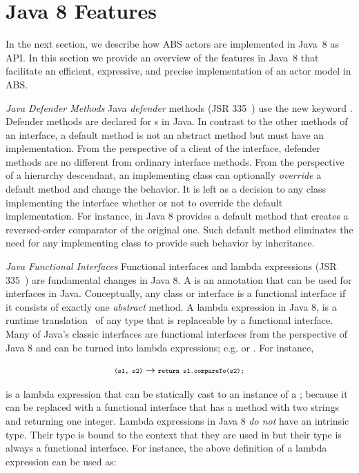 \section{Java 8 Features}
\label{sec:j8:features}

In the next section, we describe how ABS actors are implemented in Java~8 as API.
In this section we provide an overview of the features in Java~8 that facilitate an efficient, expressive, and precise implementation of an actor model
in ABS.

\textsl{Java Defender Methods}
Java \emph{defender} methods (JSR 335~\cite{jsr335}) use the new keyword . 
Defender methods are declared for s in Java. 
In contrast to the other methods of an interface, a default method is not an abstract method but  must have an implementation.
From the perspective of a client of the interface, defender methods are no different from ordinary interface methods.
From the perspective of a hierarchy descendant, an implementing class can optionally \textit{override} a default method and change the behavior.
It is left as a decision to any class implementing the interface whether or not to override the default implementation.
For instance, in Java 8  provides a default method  that creates a reversed-order comparator of the original one.
Such default method eliminates the need for any implementing class to provide such behavior by inheritance.

\textsl{Java Functional Interfaces}
Functional interfaces and lambda expressions (JSR 335~\cite{jsr335}) are fundamental changes in Java 8. 
A  is an annotation that can be used for interfaces in Java.
Conceptually, any class or interface is a functional interface if it consists of exactly one \emph{abstract} method.
A lambda expression in Java 8, is a runtime translation~\cite{jsr335:lambda:translation} of any type that is replaceable by a functional interface.
Many of Java's classic interfaces are functional interfaces from the perspective of Java 8 and can be turned into lambda expressions; 
e.g.  or .
For instance,

$$
{\scriptsize\texttt{(s1, s2)}} \to {\scriptsize\texttt{return s1.compareTo(s2);}}
$$

is a lambda expression that can be statically cast to an instance of a ;
because it can be replaced with a functional interface that has a method with two strings and returning one integer.
Lambda expressions in Java 8 \emph{do not} have an intrinsic type.
Their type is bound to the context that they are used in but their type is always a functional interface.
For instance, the above definition of a lambda expression can be used as:

